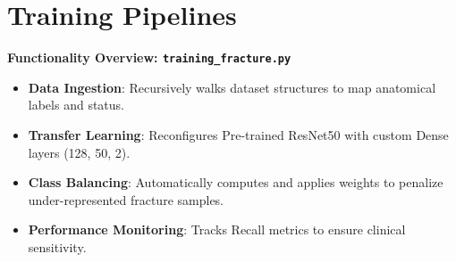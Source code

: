 \documentclass[a4paper,12pt]{report}
\begin{document}
    \section{Training Pipelines}
    \textbf{Functionality Overview: \texttt{training\_fracture.py}}
    \begin{itemize}
        \item \textbf{Data Ingestion}: Recursively walks dataset structures to map anatomical labels and status.
        \item \textbf{Transfer Learning}: Reconfigures Pre-trained ResNet50 with custom Dense layers (128, 50, 2).
        \item \textbf{Class Balancing}: Automatically computes and applies weights to penalize under-represented fracture samples.
        \item \textbf{Performance Monitoring}: Tracks Recall metrics to ensure clinical sensitivity.
    \end{itemize}
\end{document}
